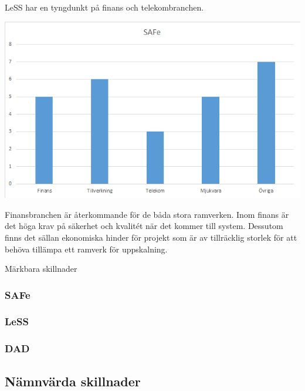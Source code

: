 	LeSS har en tyngdunkt på finans och telekombranchen.
		
	\begin{center}
		\includegraphics{Grafer/SAFe_brancher.png}
	\end{center}
	
	
	
	Finansbranchen är återkommande för de båda stora ramverken. Inom finans är det höga krav på säkerhet och kvalitét när det kommer till system. Dessutom finns det sällan ekonomiska hinder för projekt som är av tillräcklig storlek för att behöva tillämpa ett ramverk för uppskalning. 
	
	Märkbara skillnader 
	
	
	\subsubsection{SAFe}	
	
	\subsubsection{LeSS}
	
	\subsubsection{DAD}
	
	\subsection{Nämnvärda skillnader}